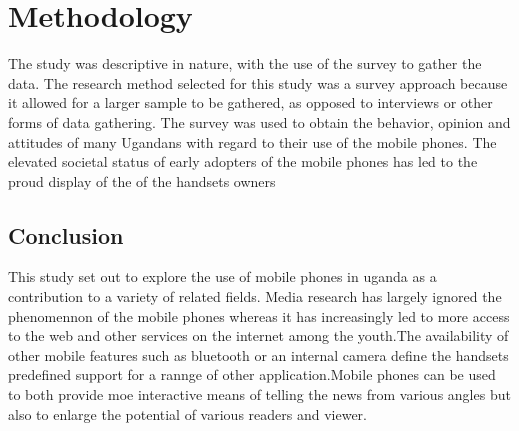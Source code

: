 \documentclass[12]{article}
\begin{document}
\section{Methodology}
The study was descriptive in nature, with the use of the survey to gather the data. The research method selected for this study was a survey approach because it allowed for a larger sample to be gathered, as opposed to interviews or other forms of data gathering. The survey was used to obtain the behavior, opinion and attitudes of many Ugandans with regard to their use of the mobile phones.
The elevated societal status of early adopters of the mobile phones has led to the proud display of the of the handsets owners




\subsection{Conclusion}
This study set out to explore the use of mobile phones in uganda as a contribution to a variety of related fields. Media research has largely ignored the phenomennon of the mobile phones whereas it has increasingly led to more access to the web and other services on the internet among the youth.The availability of other mobile features such as bluetooth or an internal camera define the handsets predefined support for a rannge of other application.Mobile phones can be used to both provide moe interactive means of telling the news from various angles but also to enlarge the potential of various readers and viewer.
\end{document}
